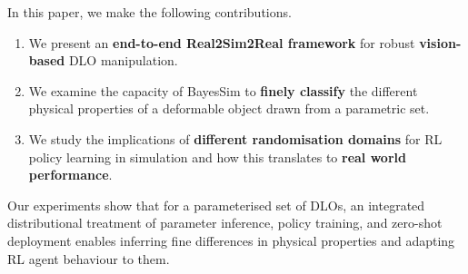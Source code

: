 In this paper, we make the following contributions.
\begin{enumerate}
    \item We present an \textbf{end-to-end Real2Sim2Real framework} for robust \textbf{vision-based} DLO manipulation. 
    \item We examine the capacity of BayesSim to \textbf{finely classify} the different physical properties of a deformable object drawn from a parametric set.
    \item We study the implications of \textbf{different randomisation domains} for RL policy learning in simulation and how this translates to \textbf{real world performance}. 
\end{enumerate}
Our experiments show that for a parameterised set of DLOs, an integrated distributional treatment of parameter inference, policy training, and zero-shot deployment enables inferring fine differences in physical properties and adapting RL agent behaviour to them.
